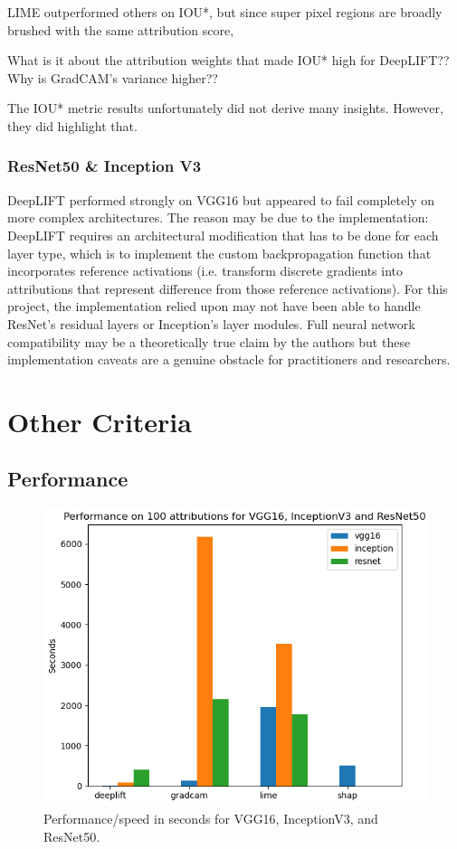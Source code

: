 \documentclass[main]{subfiles}
\begin{document}
LIME outperformed others on IOU*, but since super pixel regions are broadly brushed with the same attribution score, 


What is it about the attribution weights that made IOU* high for DeepLIFT?? Why is GradCAM's variance higher??

The IOU* metric results unfortunately did not derive many insights. However, they did highlight that.


\subsubsection{ResNet50 \& Inception V3}

DeepLIFT performed strongly on VGG16 but appeared to fail completely on more complex architectures. The reason may be due to the implementation: DeepLIFT requires an architectural modification that has to be done for each layer type, which is to implement the custom backpropagation function that incorporates reference activations (i.e. transform discrete gradients into attributions that represent difference from those reference activations). For this project, the implementation relied upon may not have been able to handle ResNet's residual layers or Inception's layer modules. Full neural network compatibility may be a theoretically true claim by the authors but these implementation caveats are a genuine obstacle for practitioners and researchers.



\newpage
\section{Other Criteria}
\subsection{Performance} \label{sec:perform}


\begin{figure}[h]\centering
\vfill
\includegraphics[scale=0.6]{performance.png}
\caption{Performance/speed in seconds for VGG16, InceptionV3, and ResNet50. }
\label{performFig}
\vfill
\end{figure}
\end{document}

